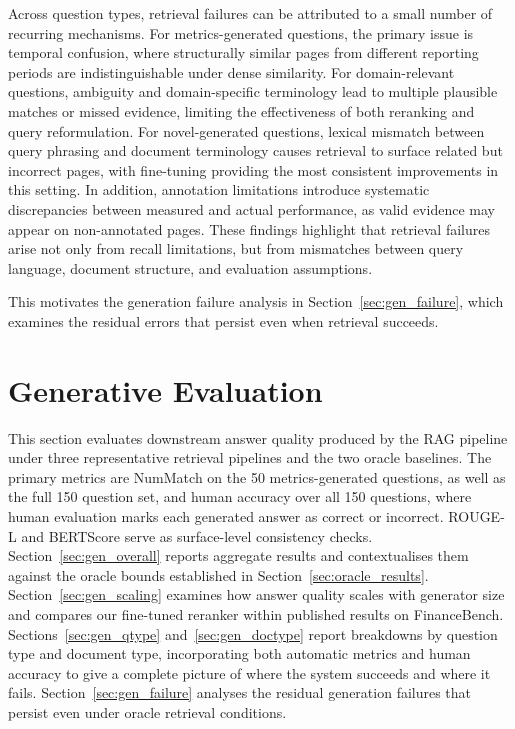 \documentclass[12pt,twoside,maitrise]{dms}
\theoremstyle{definition}
\numberwithin{equation}{section}
\numberwithin{table}{chapter}
\numberwithin{figure}{chapter}
\begin{document}
Across question types, retrieval failures can be attributed to a small number of
recurring mechanisms. For metrics-generated questions, the primary issue is temporal
confusion, where structurally similar pages from different reporting periods are
indistinguishable under dense similarity. For domain-relevant questions, ambiguity and
domain-specific terminology lead to multiple plausible matches or missed evidence,
limiting the effectiveness of both reranking and query reformulation. For
novel-generated questions, lexical mismatch between query phrasing and document
terminology causes retrieval to surface related but incorrect pages, with fine-tuning
providing the most consistent improvements in this setting. In addition, annotation limitations introduce systematic discrepancies between measured
and actual performance, as valid evidence may appear on non-annotated pages. These
findings highlight that retrieval failures arise not only from recall limitations, but
from mismatches between query language, document structure, and evaluation assumptions.

This motivates the generation failure analysis in
Section~\ref{sec:gen_failure}, which examines the residual errors that persist even when
retrieval succeeds.


\section{Generative Evaluation}
\label{sec:gen_results}

This section evaluates downstream answer quality produced by the RAG pipeline under
three representative retrieval pipelines and the two oracle baselines. The primary
metrics are NumMatch on the 50 metrics-generated questions, as well as the full 150 question set, and human accuracy over all
150 questions, where human evaluation marks each generated answer as correct or incorrect.
ROUGE-L and BERTScore serve as surface-level consistency checks. Section~\ref{sec:gen_overall}
reports aggregate results and contextualises them against the oracle bounds established
in Section~\ref{sec:oracle_results}. Section~\ref{sec:gen_scaling} examines how answer
quality scales with generator size and compares our fine-tuned reranker within published
results on FinanceBench. Sections~\ref{sec:gen_qtype} and~\ref{sec:gen_doctype}
report breakdowns by question type and document type, incorporating both automatic
metrics and human accuracy to give a complete picture of where the system succeeds and
where it fails. Section~\ref{sec:gen_failure} analyses the residual generation failures
that persist even under oracle retrieval conditions.
\end{document}
